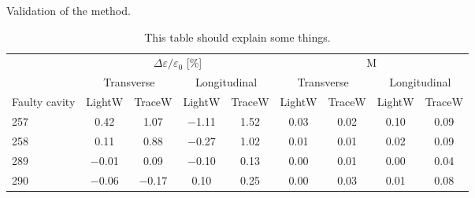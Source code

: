 \begin{frame}[t]
\begin{columns}[t]
\begin{column}{\colwidth}
			\begin{block}{Validation of the method.}
				\begin{table}
					\caption{%
						This table should explain some things.
					}
					\label{tab:optics}
					\begin{center}
						\begin{tabular}{@{} l c c c c c c c c @{}}
							\toprule
							              & \multicolumn{4}{c}{$\Delta\varepsilon/\varepsilon_0$ [\si{\percent}]} & \multicolumn{4}{c}{M}                                                                                                                                                                    \\
							\cmidrule(l){2-5}         \cmidrule(r){6-9}
							              & \multicolumn{2}{c}{Transverse}                                        & \multicolumn{2}{c}{Longitudinal} & \multicolumn{2}{c}{Transverse} & \multicolumn{2}{c}{Longitudinal}                                                                                     \\
							\cmidrule(l){2-3}\cmidrule(rl){4-5}\cmidrule(rl){6-7}\cmidrule(r){8-9}
							Faulty cavity & LightW                                                                & TraceW                           & LightW                         & TraceW                           & LightW             & TraceW             & LightW             & TraceW             \\
							\midrule
							257           & \num{ 0.42}                                                           & \num{1.07}                       & \num{-1.11}                    & \num{1.52}                       & \alert{\num{0.03}} & \alert{\num{0.02}} & \alert{\num{0.10}} & \alert{\num{0.09}} \\
							258           & \num{ 0.11}                                                           & \num{0.88}                       & \num{-0.27}                    & \num{1.02}                       & \num{0.01}         & \num{0.01}         & \num{0.02}         & \num{0.09}         \\
							289           & \num{-0.01}                                                           & \num{0.09}                       & \num{-0.10}                    & \num{0.13}                       & \num{0.00}         & \num{0.01}         & \num{0.00}         & \num{0.04}         \\
							290           & \num{-0.06}                                                           & \num{-0.17}                      & \num{ 0.10}                    & \num{0.25}                       & \num{0.00}         & \num{0.03}         & \num{0.01}         & \num{0.08}         \\

\end{tabular}
\end{center}
\end{table}
\end{block}
\end{column}
\end{columns}
\end{frame}
